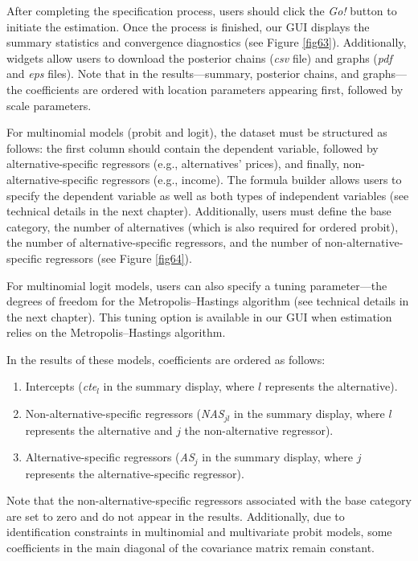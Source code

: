 After completing the specification process, users should click the \textit{Go!} button to initiate the estimation. Once the process is finished, our GUI displays the summary statistics and convergence diagnostics (see Figure \ref{fig63}). Additionally, widgets allow users to download the posterior chains (\textit{csv} file) and graphs (\textit{pdf} and \textit{eps} files). Note that in the results—summary, posterior chains, and graphs—the coefficients are ordered with location parameters appearing first, followed by scale parameters.

For multinomial models (probit and logit), the dataset must be structured as follows: the first column should contain the dependent variable, followed by alternative-specific regressors (e.g., alternatives' prices), and finally, non-alternative-specific regressors (e.g., income). The formula builder allows users to specify the dependent variable as well as both types of independent variables (see technical details in the next chapter). Additionally, users must define the base category, the number of alternatives (which is also required for ordered probit), the number of alternative-specific regressors, and the number of non-alternative-specific regressors (see Figure \ref{fig64}).

For multinomial logit models, users can also specify a tuning parameter—the degrees of freedom for the Metropolis–Hastings algorithm (see technical details in the next chapter). This tuning option is available in our GUI when estimation relies on the Metropolis–Hastings algorithm.

In the results of these models, coefficients are ordered as follows:

\begin{enumerate}
	\item Intercepts (\textit{cte}$_l$ in the summary display, where $l$ represents the alternative).
	\item Non-alternative-specific regressors (\textit{NAS}$_{jl}$ in the summary display, where $l$ represents the alternative and $j$ the non-alternative regressor).
	\item Alternative-specific regressors (\textit{AS}$_{j}$ in the summary display, where $j$ represents the alternative-specific regressor).
\end{enumerate}

Note that the non-alternative-specific regressors associated with the base category are set to zero and do not appear in the results. Additionally, due to identification constraints in multinomial and multivariate probit models, some coefficients in the main diagonal of the covariance matrix remain constant.

